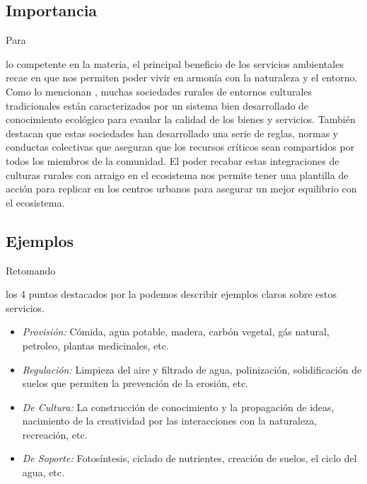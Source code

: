 \documentclass[stu, 12pt, letterpaper, donotrepeattitle, floatsintext, natbib]{apa7}
\begin{document}
\subsection{Importancia}
Para \begin{justifying}
    lo competente en la materia, el principal beneficio de los servicios ambientales recae en que nos permiten poder vivir en armonía con la naturaleza y el entorno. 
    Como lo mencionan \cite{hartel-2014},
    muchas sociedades rurales de entornos culturales tradicionales están caracterizados por un sistema bien desarrollado de conocimiento ecológico para evaular
    la calidad de los bienes y servicios. También destacan que estas sociedades han desarrollado una serie de reglas, normas y conductas colectivas que aseguran
    que los recursos críticos sean compartidos por todos los miembros de la comunidad. El poder recabar estas integraciones de culturas rurales con arraigo en el ecosistema
    nos permite tener una plantilla de acción para replicar en los centros urbanos para asegurar un mejor equilibrio con el ecosistema.\par
\end{justifying}
\vspace{\baselineskip}
\subsection{Ejemplos}
Retomando \begin{justifying}
    los 4 puntos destacados por la \cite{national-wildlife-federation-no-date}
    podemos describir ejemplos claros sobre estos servicios.
    \begin{itemize}
        \item \emph{Provisión:} Cómida, agua potable, madera, carbón vegetal, gás natural, petroleo, plantas medicinales, etc.
        \item \emph{Regulación:} Limpieza del aire y filtrado de agua, polinización, solidificación de suelos que permiten la prevención de la erosión, etc.
        \item \emph{De Cultura:} La construcción de conocimiento y la propagación de ideas, nacimiento de la creatividad por las interacciones con la naturaleza, recreación, etc.
        \item \emph{De Soporte:} Fotosíntesis, ciclado de nutrientes, creación de suelos, el ciclo del agua, etc.
    \end{itemize}\par  
\end{justifying}
\vspace{\baselineskip}
\end{document}
